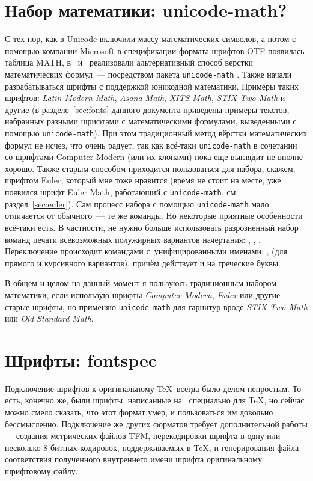 \documentclass[a4paper,12pt,hyphens]{article}
\newcommand\package[1]{\texttt{#1}}
\newcommand\lcmd[1]{\texttt{#1}}
\begin{document}
\section{Набор математики: unicode-math?}
С тех пор, как в Unicode включили массу математических символов, а потом с
помощью компании Microsoft в спецификации формата шрифтов OTF
появилась таблица MATH, в \LuaLaTeX\ и \XeTeX\ реализовали альтернативный
способ верстки математических формул~--- посредством пакета
\package{unicode-math} \parencite{ctan-unicode-math}.
Также начали разрабатываться шрифты с поддержкой юникодной математики. Примеры таких
шрифтов: \emph{Latin Modern Math}, \emph{Asana Math}, \emph{XITS Math},
\emph{STIX Two Math} и другие (в разделе~\ref{sec:fonts} данного документа приведены
примеры текстов, набранных разными шрифтами с математическими формулами, выведенными
с помощью \package{unicode-math}).
При этом традиционный метод вёрстки математических формул не исчез, что
очень радует, так как всё-таки \package{unicode-math} в сочетании со шрифтами
Computer Modern (или их клонами) пока еще выглядит не вполне хорошо.
Также старым способом приходится пользоваться для набора, скажем, шрифтом
Euler, который мне тоже нравится (время не стоит на месте, уже появился шрифт Euler Math,
работающий с \package{unicode-math}, см. раздел~\ref{sec:euler}). Сам процесс набора с помощью \package{unicode-math}
мало отличается от обычного~--- те же команды. Но некоторые приятные особенности всё-таки
есть. В частности, не нужно больше использовать разрозненный набор команд
печати всевозможных полужирных вариантов начертания: \lcmd{\mathbf}, \lcmd{\boldkey},
\lcmd{\boldsymbol}. Переключение происходит командами с~унифицированными именами:
\lcmd{\symbfup}, \lcmd{\symbfit} (для прямого и курсивного вариантов), причём
действует и на греческие буквы.

В общем и целом на данный момент я пользуюсь традиционным набором математики,
если использую шрифты \emph{Computer Modern}, \emph{Euler} или другие старые шрифты, но
применяю \package{unicode-math} для гарнитур вроде \emph{STIX Two Math} или
\emph{Old Standard Math}.

\section{Шрифты: fontspec}
Подключение шрифтов к оригинальному \TeX\ всегда было делом непростым.
То есть, конечно же, были шрифты, написанные на \METAFONT\ специально для
\TeX, но сейчас можно смело сказать, что этот формат умер, и пользоваться
им довольно бессмысленно. Подключение же других форматов требует
дополнительной работы --- создания метрических файлов TFM, перекодировки
шрифта в одну или несколько 8-битных кодировок, поддерживаемых в \TeX,
и генерирования файла соответствия полученного внутреннего имени шрифта
оригинальному шрифтовому файлу.
\end{document}
